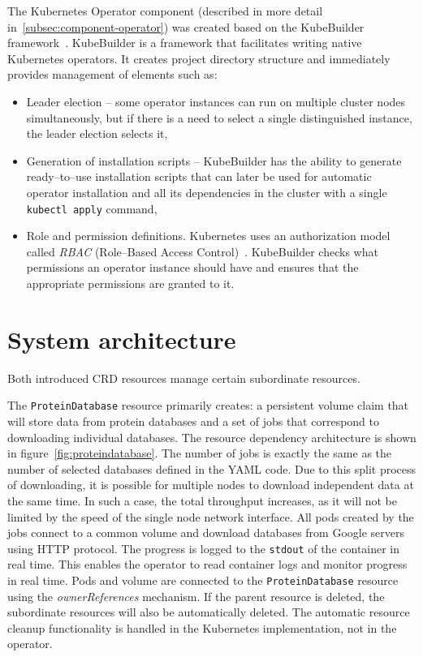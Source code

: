 The Kubernetes Operator component (described in more detail in~\ref{subsec:component-operator}) was created based on the KubeBuilder framework~\cite{kubebuilder}.
KubeBuilder is a framework that facilitates writing native Kubernetes operators.
It creates project directory structure and immediately provides management of elements such as:
\begin{itemize}
    \item Leader election -- some operator instances can run on multiple cluster nodes simultaneously, but if there is a need to select a single distinguished instance, the leader election selects it,
    \item Generation of installation scripts -- KubeBuilder has the ability to generate ready--to--use installation scripts that can later be used for automatic operator installation and all its dependencies in the cluster with a single \texttt{kubectl apply} command,
    \item Role and permission definitions.
    Kubernetes uses an authorization model called \textit{RBAC} (Role--Based Access Control)~\cite{k8s_rbac}.
    KubeBuilder checks what permissions an operator instance should have and ensures that the appropriate permissions are granted to it.
\end{itemize}


\section{System architecture}

Both introduced CRD resources manage certain subordinate resources.

The \texttt{ProteinDatabase} resource primarily creates: a persistent volume claim that will store data from protein databases and a set of jobs that correspond to downloading individual databases.
The resource dependency architecture is shown in figure~\ref{fig:proteindatabase}.
The number of jobs is exactly the same as the number of selected databases defined in the YAML code.
Due to this split process of downloading, it is possible for multiple nodes to download independent data at the same time.
In such a case, the total throughput increases, as it will not be limited by the speed of the single node network interface.
All pods created by the jobs connect to a common volume and download databases from Google servers using HTTP protocol.
The progress is logged to the \texttt{stdout} of the container in real time.
This enables the operator to read container logs and monitor progress in real time.
Pods and volume are connected to the \texttt{ProteinDatabase} resource using the \textit{ownerReferences} mechanism.
If the parent resource is deleted, the subordinate resources will also be automatically deleted.
The automatic resource cleanup functionality is handled in the Kubernetes implementation, not in the operator.

